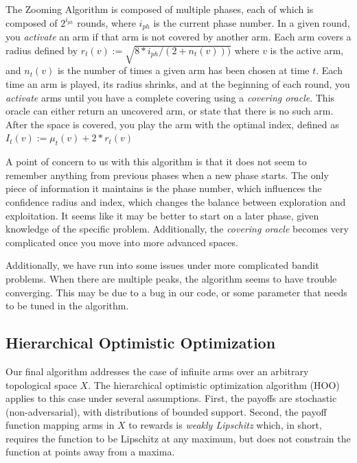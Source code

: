 \documentclass{article}
\begin{document}
The Zooming Algorithm is composed of multiple phases, each of which is
composed of $2^{i_{ph}}$ rounds, where $i_{ph}$ is the current phase
number. In a given round, you \emph{activate} an arm if that arm is
not covered by another arm. Each arm covers a radius defined by
$r_t(v):=\sqrt{8*i_{ph}/(2+n_t(v)))}$ where $v$ is the active arm, and
$n_t(v)$ is the number of times a given arm has been chosen at time
$t$. Each time an arm is played, its radius shrinks, and at the
beginning of each round, you \emph{activate} arms until you have a
complete covering using a \emph{covering oracle}. This oracle can
either return an uncovered arm, or state that there is no such
arm. After the space is covered, you play the arm with the optimal
index, defined as $I_t(v):=\mu_t(v)+2*r_t(v)$

A point of concern to us with this algorithm is that it does not seem
to remember anything from previous phases when a new phase starts. The
only piece of information it maintains is the phase number, which
influences the confidence radius and index, which changes the balance
between exploration and exploitation. It seems like it may be better
to start on a later phase, given knowledge of the specific
problem. Additionally, the \emph{covering oracle} becomes very
complicated once you move into more advanced spaces.

Additionally, we have run into some issues under more complicated
bandit problems. When there are multiple peaks, the algorithm seems to
have trouble converging. This may be due to a bug in our code, or some
parameter that needs to be tuned in the algorithm.

\subsection{Hierarchical Optimistic Optimization}
Our final algorithm addresses the case of infinite arms over an
arbitrary topological space $X$. The hierarchical optimistic
optimization algorithm (HOO) applies to this case under several
assumptions. First, the payoffs are stochastic (non-adversarial), with
distributions of bounded support. Second, the payoff function mapping
arms in $X$ to rewards is \emph{weakly Lipschitz} which, in short, requires
the function to be Lipschitz at any maximum, but does not constrain the
function at points away from a maxima.
\end{document}
